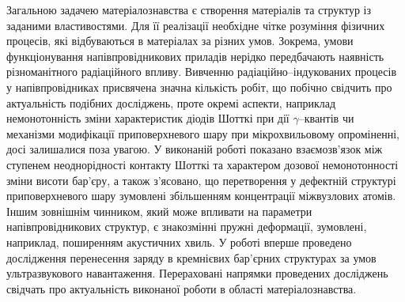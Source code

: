 Загальною задачею матеріалознавства є створення матеріалів та структур із заданими властивостями.
Для її реалізації необхідне чітке розуміння фізичних процесів, які відбуваються в матеріалах за різних умов.
Зокрема, умови функціонування напівпровідникових приладів нерідко передбачають наявність різноманітного радіаційного впливу.
Вивченню радіаційно--індукованих процесів у напівпровідниках присвячена значна кількість робіт, що побічно свідчить про актуальність подібних досліджень,
проте окремі аспекти, наприклад немонотонність зміни характеристик діодів Шотткі при дії $\gamma$--квантів чи механізми модифікації приповерхневого шару при мікрохвильовому опроміненні, досі залишалися поза увагою.
У виконаній роботі показано взаємозв'язок між ступенем неоднорідності контакту Шотткі та характером дозової немонотонності зміни висоти бар'єру, а також з'ясовано, що перетворення у дефектній структурі приповерхневого шару зумовлені збільшенням концентрації міжвузлових атомів.
Іншим зовнішнім чинником, який може впливати на параметри напівпровідникових структур, є знакозмінні пружні деформації, зумовлені, наприклад, поширенням акустичних хвиль.
У роботі вперше проведено дослідження перенесення заряду в кремнієвих бар'єрних структурах за умов ультразвукового навантаження.
Перераховані напрямки проведених досліджень свідчать про актуальність виконаної роботи в області матеріалознавства.



